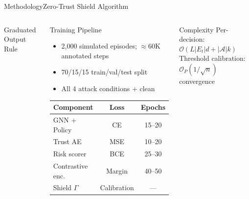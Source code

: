 \documentclass[aspectratio=169,10pt]{beamer}
\newcommand{\tightlist}{\setlength{\itemsep}{2pt}\setlength{\parskip}{0pt}\setlength{\topsep}{0pt}}
\begin{document}
\begin{frame}[t,shrink=20]{Methodology}{Zero-Trust Shield Algorithm}
\begin{columns}[t]
\begin{alertblock}{Graduated Output Rule}
    \end{alertblock}
    \begin{block}{Training Pipeline}
      \footnotesize
      \begin{itemize}\tightlist
        \item 2,000 simulated episodes; ${\approx}60$K annotated steps
        \item 70/15/15 train/val/test split
        \item All 4 attack conditions + clean
      \end{itemize}
      \vspace{0.15cm}
      \renewcommand{\arraystretch}{1.1}
      \begin{tabular}{@{}lcc@{}}
        \toprule
        \textbf{Component} & \textbf{Loss} & \textbf{Epochs} \\
        \midrule
        GNN + Policy & CE & 15--20 \\
        Trust AE & MSE & 10--20 \\
        Risk scorer & BCE & 25--30 \\
        Contrastive enc. & Margin & 40--50 \\
        Shield $\Gamma$ & Calibration & --- \\
        \bottomrule
      \end{tabular}
    \end{block}
    \vspace{0.2cm}
    \begin{exampleblock}{Complexity}
      \footnotesize Per-decision: $\mathcal{O}(L|E_t|d + |\mathcal{A}|k)$\\
      Threshold calibration: $\mathcal{O}_P(1/\sqrt{n})$ convergence
    \end{exampleblock}
  \end{columns}
\end{frame}
\end{document}
